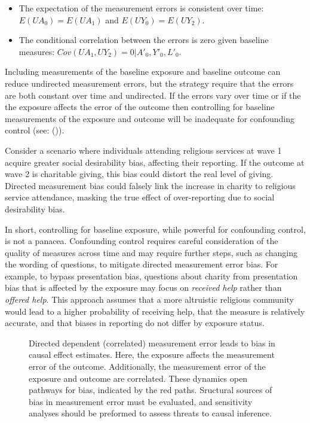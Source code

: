 \documentclass[
  singlecolumn]{article}
\providecommand{\tightlist}{%
  \setlength{\itemsep}{0pt}\setlength{\parskip}{0pt}}\usepackage{longtable,booktabs,array}
\begin{document}
\begin{itemize}
\tightlist
\item
  The expectation of the measurement errors is consistent over time:
  \(E(UA_0) = E(UA_1)\) and \(E(UY_0) = E(UY_2)\).
\item
  The conditional correlation between the errors is zero given baseline
  measures: \(Cov(UA_1, UY_2) = 0 | A'_0,Y'_0,L'_0\).
\end{itemize}

Including measurements of the baseline exposure and baseline outcome can
reduce undirected measurement errors, but the strategy require that the
errors are both constant over time and undirected. If the errors vary
over time or if the the exposure affects the error of the outcome then
controlling for baseline measurements of the exposure and outcome will
be inadequate for confounding control (see:
()).

Consider a scenario where individuals attending religious services at
wave 1 acquire greater social desirability bias, affecting their
reporting. If the outcome at wave 2 is charitable giving, this bias
could distort the real level of giving. Directed measurement bias could
falsely link the increase in charity to religious service attendance,
masking the true effect of over-reporting due to social desirability
bias.

In short, controlling for baseline exposure, while powerful for
confounding control, is not a panacea. Confounding control requires
careful consideration of the quality of measures across time and may
require further steps, such as changing the wording of questions, to
mitigate directed measurement error bias. For example, to bypass
presentation bias, questions about charity from presentation bias that
is affected by the exposure may focus on \emph{received help} rather
than \emph{offered help}. This approach assumes that a more altruistic
religious community would lead to a higher probability of receiving
help, that the measure is relatively accurate, and that biases in
reporting do not differ by exposure status.

\begin{figure}


\caption{\label{fig-dag-d-d}Directed dependent (correlated) measurement
error leads to bias in causal effect estimates. Here, the exposure
affects the measurement error of the outcome. Additionally, the
measurement error of the exposure and outcome are correlated. These
dynamics open pathways for bias, indicated by the red paths. Sructural
sources of bias in measurement error must be evaluated, and sensitivity
analyses should be preformed to assess threats to causal inference.}

\end{figure}%
\end{document}
